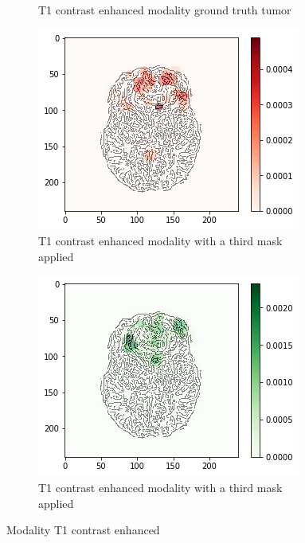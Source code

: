 \begin{figure}[H]
\begin{subfigure}[t]{.21\textwidth}
        \caption{T1 contrast enhanced modality ground truth tumor}
    \end{subfigure}
    \begin{subfigure}[t]{.27\textwidth}
        \centering
        \includegraphics[width=\linewidth]{chapters/06_hdm/c_Brats18_2013_17_1_L1/48.png}
        \caption{T1 contrast enhanced modality with a third mask applied}
    \end{subfigure}
    \begin{subfigure}[t]{.27\textwidth}
        \centering
        \includegraphics[width=\linewidth]{chapters/06_hdm/c_Brats18_2013_17_1_L1/49.png}
        \caption{T1 contrast enhanced modality with a third mask applied}
    \end{subfigure}
    \caption{Modality T1 contrast enhanced}
\end{figure}

